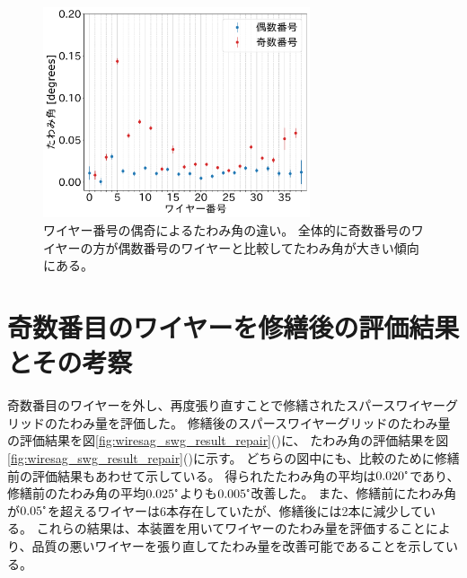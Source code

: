 \documentclass[../../main.tex]{subfiles}
\begin{document}
\begin{figure}[H]
    \centering
    \includegraphics[width=0.7\textwidth]{wiresag_swg/swg_sag_angle_before_even_odd.pdf}
    \caption{ワイヤー番号の偶奇によるたわみ角の違い。
    全体的に奇数番号のワイヤーの方が偶数番号のワイヤーと比較してたわみ角が大きい傾向にある。}
    \label{fig:wiresag_swg_even_odd}
\end{figure}

\section{奇数番目のワイヤーを修繕後の評価結果とその考察}
奇数番目のワイヤーを外し、再度張り直すことで修繕されたスパースワイヤーグリッドのたわみ量を評価した。
修繕後のスパースワイヤーグリッドのたわみ量の評価結果を図\ref{fig:wiresag_swg_result_repair}()に、
たわみ角の評価結果を図\ref{fig:wiresag_swg_result_repair}()に示す。
どちらの図中にも、比較のために修繕前の評価結果もあわせて示している。
得られたたわみ角の平均は$0.020\tcdegree$であり、修繕前のたわみ角の平均$0.025\tcdegree$よりも$0.005\tcdegree$改善した。
また、修繕前にたわみ角が$0.05\tcdegree$を超えるワイヤーは6本存在していたが、修繕後には2本に減少している。
これらの結果は、本装置を用いてワイヤーのたわみ量を評価することにより、品質の悪いワイヤーを張り直してたわみ量を改善可能であることを示している。


\end{document}
